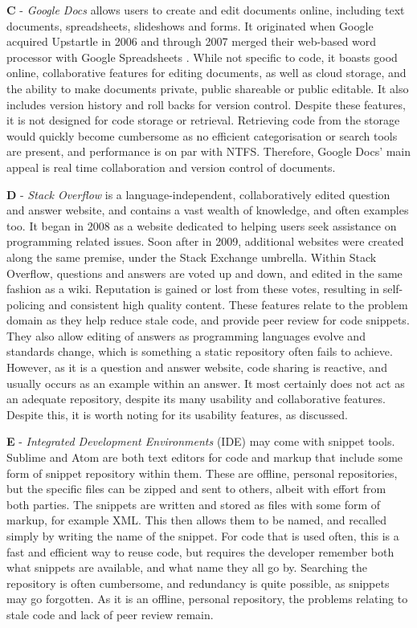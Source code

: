 \textbf{C} - \textit{Google Docs} allows users to create and edit documents online, including text documents, spreadsheets, slideshows and forms. It originated when Google acquired Upstartle in 2006 and through 2007 merged their web-based word processor with Google Spreadsheets \cite{Mazzon2006}. While not specific to code, it boasts good online, collaborative features for editing documents, as well as cloud storage, and the ability to make documents private, public shareable or public editable. It also includes version history and roll backs for version control. Despite these features, it is not designed for code storage or retrieval. Retrieving code from the storage would quickly become cumbersome as no efficient categorisation or search tools are present, and performance is on par with NTFS. Therefore, Google Docs' main appeal is real time collaboration and version control of documents.

\textbf{D} - \textit{Stack Overflow} is a language-independent, collaboratively edited question and answer website, and contains a vast wealth of knowledge, and often examples too. It began in 2008 as a website dedicated to helping users seek assistance on programming related issues. Soon after in 2009, additional websites were created along the same premise, under the Stack Exchange umbrella. Within Stack Overflow, questions and answers are voted up and down, and edited in the same fashion as a wiki. Reputation is gained or lost from these votes, resulting in self-policing and consistent high quality content. These features relate to the problem domain as they help reduce stale code, and provide peer review for code snippets. They also allow editing of answers as programming languages evolve and standards change, which is something a static repository often fails to achieve. However, as it is a question and answer website, code sharing is reactive, and usually occurs as an example within an answer. It most certainly does not act as an adequate repository, despite its many usability and collaborative features. Despite this, it is worth noting for its usability features, as discussed.

\textbf{E} - \textit{Integrated Development Environments} (IDE) may come with snippet tools. Sublime and Atom are both text editors for code and markup that include some form of snippet repository within them. These are offline, personal repositories, but the specific files can be zipped and sent to others, albeit with effort from both parties. The snippets are written and stored as files with some form of markup, for example XML. This then allows them to be named, and recalled simply by writing the name of the snippet. For code that is used often, this is a fast and efficient way to reuse code, but requires the developer remember both what snippets are available, and what name they all go by. Searching the repository is often cumbersome, and redundancy is quite possible, as snippets may go forgotten. As it is an offline, personal repository, the problems relating to stale code and lack of peer review remain.

